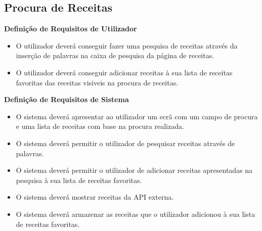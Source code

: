 \documentclass[a4paper]{report}
\begin{document}
        \subsection{Procura de Receitas}
            \textbf{Definição de Requisitos de Utilizador}
            \begin{itemize}
                \item O utilizador deverá conseguir fazer uma pesquisa
                de receitas através da inserção de palavras na caixa
                de pesquisa da página de receitas.
                \item O utilizador deverá conseguir adicionar receitas
                à sua lista de receitas favoritas das receitas 
                visiveis na procura de receitas.
            \end{itemize}
            \textbf{Definição de Requisitos de Sistema}
            \begin{itemize}
                \item O sistema deverá apresentar ao utilizador um ecrã
                com um campo de procura e uma lista de receitas com base
                na procura realizada.
                \item O sistema deverá permitir o utilizador de pesquisar
                receitas através de palavras.
                \item O sistema deverá permitir o utilizador de adicionar
                receitas apresentadas na pesquisa à sua lista de receitas
                favoritas.
                \item O sistema deverá mostrar receitas da API externa.
                \item O sistema deverá armazenar as receitas que o utilizador
                adicionou à sua lista de receitas favoritas.
            \end{itemize}
\end{document}
